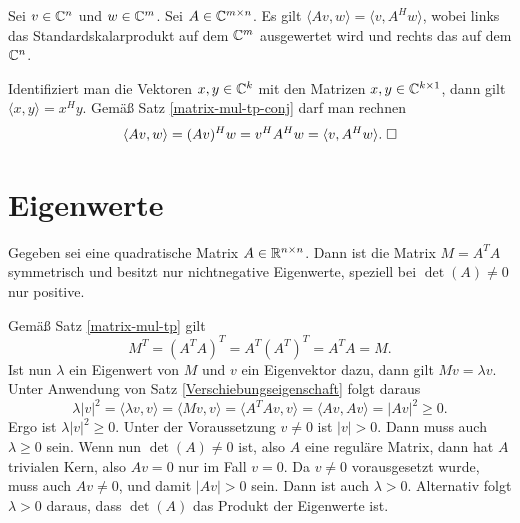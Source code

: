 \begin{Satz}\label{Verschiebungseigenschaft-komplex}
Sei $v\in\mathbb C^n$ und $w\in\mathbb C^m$. Sei $A\in\mathbb C^{m\times n}$.
Es gilt $\langle Av,w\rangle = \langle v,A^H w\rangle$,
wobei links das Standardskalarprodukt auf dem $\mathbb C^m$ ausgewertet
wird und rechts das auf dem $\mathbb C^n$.
\end{Satz}
\begin{Beweis}
Identifiziert man die Vektoren $x,y\in\mathbb C^k$ mit den Matrizen
$x,y\in\mathbb C^{k\times 1}$, dann gilt $\langle x,y\rangle = x^H y$.
Gemäß Satz \ref{matrix-mul-tp-conj} darf man rechnen
\[\langle Av,w\rangle = (Av)^H w = v^H A^H w
= \langle v,A^Hw\rangle.\;\square\]
\end{Beweis}

\section{Eigenwerte}

\begin{Satz}
Gegeben sei eine quadratische Matrix $A\in\mathbb R^{n\times n}$.
Dann ist die Matrix $M=A^T A$ symmetrisch und besitzt nur
nichtnegative Eigenwerte, speziell bei $\det(A)\ne 0$ nur positive.
\end{Satz}

\begin{Beweis}
Gemäß Satz \ref{matrix-mul-tp} gilt
\begin{equation}
M^T = (A^T A)^T = A^T (A^T)^T = A^T A = M.
\end{equation}
Ist nun $\lambda$ ein Eigenwert von $M$ und $v$ ein Eigenvektor dazu,
dann gilt $Mv=\lambda v$. Unter Anwendung von Satz
\ref{Verschiebungseigenschaft} folgt daraus
\begin{equation}
\lambda |v|^2 = \langle\lambda v,v\rangle
= \langle Mv,v\rangle = \langle A^T Av,v\rangle
= \langle Av,Av\rangle = |Av|^2\ge 0.
\end{equation}
Ergo ist $\lambda|v|^2\ge 0$. Unter der Voraussetzung $v\ne 0$ ist
$|v|>0$. Dann muss auch $\lambda\ge 0$ sein. Wenn nun $\det(A)\ne 0$
ist, also $A$ eine reguläre Matrix, dann hat $A$ trivialen Kern,
also $Av=0$ nur im Fall $v=0$. Da $v\ne 0$ vorausgesetzt wurde,
muss auch $Av\ne 0$, und damit $|Av|>0$ sein. Dann ist auch
$\lambda>0$. Alternativ folgt $\lambda>0$ daraus, dass $\det(A)$
das Produkt der Eigenwerte ist.\;\qedsymbol
\end{Beweis}

